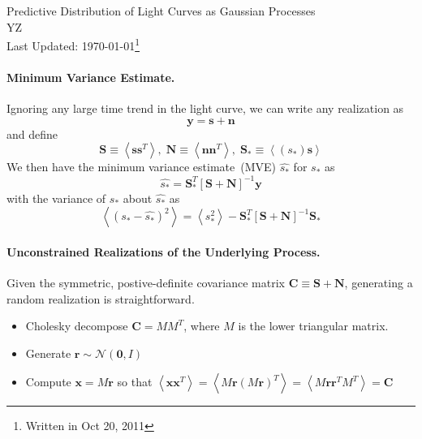 \documentclass[12pt,letterpaper]{article}
\def\sstarhat{\widehat{s_*}}
\def\sstar{s_*}
\def\bcsstar{\mathbf{S}_*}
\def\by{\mathbf{y}}
\def\bs{\mathbf{s}}
\def\bn{\mathbf{n}}
\def\br{\mathbf{r}}
\def\bx{\mathbf{x}}
\def\bcs{\mathbf{S}}
\def\bcn{\mathbf{N}}
\def\bcc{\mathbf{C}}
\begin{document}
\begin{flushright}
\linespread{1}	%
\small \normalsize %
Predictive Distribution of Light Curves as Gaussian Processes\\
YZ \\
Last Updated: \today\footnote{Written in Oct 20, 2011}
\end{flushright}

\paragraph{Minimum Variance Estimate.}

Ignoring any large time trend in the light curve, we can write any
realization as 
\begin{equation} 
\by = \bs + \bn
\end{equation}
and define
\begin{equation} 
\bcs \equiv \left<\bs\bs^T\right> ,\; \bcn \equiv
\left<\bn\bn^T\right>,\; \bcsstar \equiv \left<(\sstar)\bs\right>
\end{equation}
We then have the minimum variance estimate~(MVE) $\sstarhat$ for
$\sstar$ as
\begin{equation} 
\sstarhat = \bcsstar^T[\bcs+\bcn]^{-1}\by
\label{eqn:mve}
\end{equation}
with the variance of $\sstar$ about $\sstarhat$ as
\begin{equation} 
\left<(\sstar - \sstarhat)^2\right> = \left<\sstar^2\right> - \bcsstar^T[\bcs+\bcn]^{-1}\bcsstar
\label{eqn:variance}
\end{equation}

\paragraph{Unconstrained Realizations of the Underlying Process.} 

Given the symmetric, postive-definite covariance matrix $\bcc \equiv \bcs+\bcn$,
generating a random realization is straightforward.
\begin{itemize}
\item Cholesky decompose $\bcc = MM^T$, where $M$ is the lower
triangular matrix.
\item Generate $\br \sim \mathcal{N}(\mathbf{0}, I)$
\item Compute $\bx = M\br$ so that
$\left<\bx\bx^T\right>=\left<M\br (M\br)^T
\right>=\left<M\br\br^TM^T\right>=\bcc$
\end{itemize}
\end{document}
